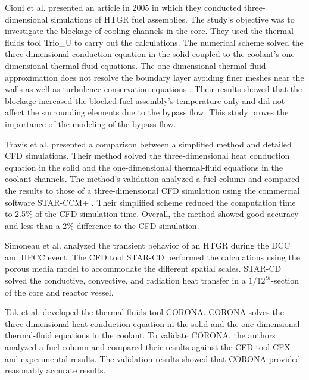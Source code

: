 Cioni et al. \cite{cioni_3d_2005} presented an article in 2005 in which they conducted three-dimensional simulations of HTGR fuel assemblies.
The study's objective was to investigate the blockage of cooling channels in the core.
They used the thermal-fluids tool Trio\_U \cite{bieder_priceles_2000} to carry out the calculations.
The numerical scheme solved the three-dimensional conduction equation in the solid coupled to the coolant's one-dimensional thermal-fluid equations.
The one-dimensional thermal-fluid approximation does not resolve the boundary layer avoiding finer meshes near the walls as well as turbulence conservation equations \cite{tak_development_2014}.
Their results showed that the blockage increased the blocked fuel assembly's temperature only and did not affect the surrounding elements due to the bypass flow.
This study proves the importance of the modeling of the bypass flow.

Travis et al. \cite{travis_thermalhydraulics_2013} presented a comparison between a simplified method and detailed CFD simulations.
Their method solved the three-dimensional heat conduction equation in the solid and the one-dimensional thermal-fluid equations in the coolant channels.
The method's validation analyzed a fuel column and compared the results to those of a three-dimensional CFD simulation using the commercial software STAR-CCM+ \cite{cd-adapco_star-ccm_2012}.
Their simplified scheme reduced the computation time to 2.5\% of the CFD simulation time.
Overall, the method showed good accuracy and less than a 2\% difference to the CFD simulation.

Simoneau et al. \cite{simoneau_three-dimensional_2007} analyzed the transient behavior of an \gls{HTGR} during the \gls{DCC} and \gls{HPCC} event.
The CFD tool STAR-CD \cite{computational_dynamics_limited_star-cd_2004} performed the calculations using the porous media model \cite{nield_convection_1999} to accommodate the different spatial scales.
STAR-CD solved the conductive, convective, and radiation heat transfer in a $1/12^{th}$-section of the core and reactor vessel.

Tak et al. \cite{tak_practical_2012} \cite{tak_development_2014} developed the thermal-fluids tool CORONA.
CORONA solves the three-dimensional heat conduction equation in the solid and the one-dimensional thermal-fluid equations in the coolant.
To validate CORONA, the authors analyzed a fuel column and compared their results against the CFD tool CFX and experimental results.
The validation results showed that CORONA provided reasonably accurate results.

